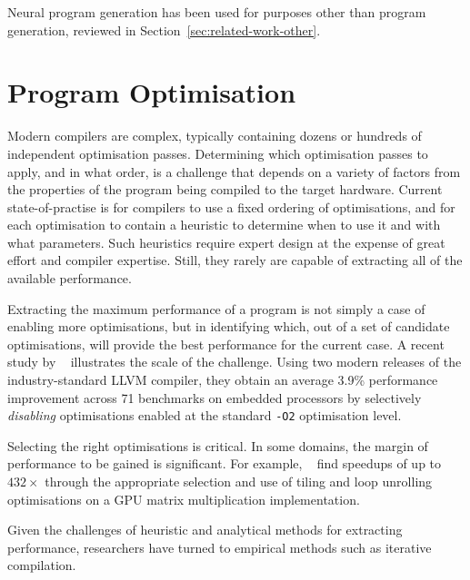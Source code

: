 Neural program generation has been used for purposes other than program generation, reviewed in Section~\ref{sec:related-work-other}.


\section{Program Optimisation}
\label{sec:related-work-optimisation}

Modern compilers are complex, typically containing dozens or hundreds of independent optimisation passes. Determining which optimisation passes to apply, and in what order, is a challenge that depends on a variety of factors from the properties of the program being compiled to the target hardware. Current state-of-practise is for compilers to use a fixed ordering of optimisations, and for each optimisation to contain a heuristic to determine when to use it and with what parameters. Such heuristics require expert design at the expense of great effort and compiler expertise. Still, they rarely are capable of extracting all of the available performance.

Extracting the maximum performance of a program is not simply a case of enabling more optimisations, but in identifying which, out of a set of candidate optimisations, will provide the best performance for the current case. A recent study by \citeauthor{Georgiou2018}~\cite{Georgiou2018} illustrates the scale of the challenge. Using two modern releases of the industry-standard LLVM compiler, they obtain an average 3.9\% performance improvement across 71 benchmarks on embedded processors by selectively \emph{disabling} optimisations enabled at the standard \texttt{-O2} optimisation level.

Selecting the right optimisations is critical. In some domains, the margin of performance to be gained is significant. For example, \citeauthor{Ryoo2008a}~\cite{Ryoo2008a} find speedups of up to $432\times$ through the appropriate selection and use of tiling and loop unrolling optimisations on a GPU matrix multiplication implementation.

Given the challenges of heuristic and analytical methods for extracting performance, researchers have turned to empirical methods such as iterative compilation.


